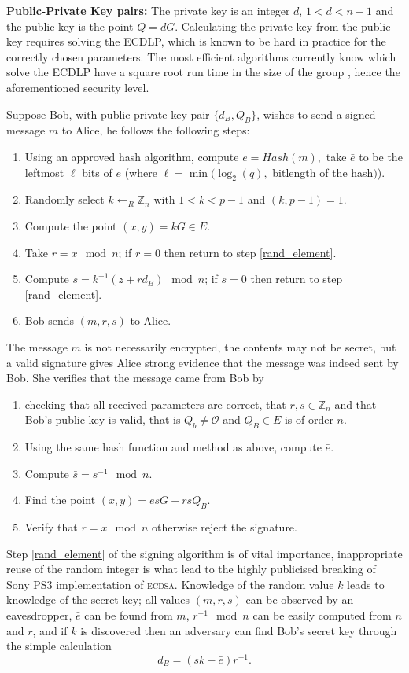 \documentclass[twocolumn]{svjour3}
\newcommand{\Z}{{\mathbb Z}}
\begin{document}
{\bf{Public-Private Key pairs:}} The private key is an integer $d$, $1<d<n-1$ and the public key is the point $Q=dG$. Calculating the private key from the public key requires solving the ECDLP, which is known to be hard in practice for the correctly chosen parameters. The most efficient algorithms currently know which solve the ECDLP have a square root run time in the size of the group \cite{WienerZ98,GallantLV00}, hence the aforementioned security level.
\vspace{0.5cm}

Suppose Bob, with public-private key pair $\{d_B,Q_B\}$, wishes to send a signed message $m$ to Alice, he follows the following steps:
\begin{enumerate}
\item Using an approved hash algorithm, compute $e=Hash(m),$ take $\bar{e}$ to be the leftmost $\ell$ bits of $e$ (where $\ell=\min(\log_2(q),$ bit\-length of the hash$)$). 
\item\label{rand_element} Randomly select $k\leftarrow_R\Z_n$ with $1<k<p-1$ and $(k,p-1)=1$.
\item\label{scalar_mult} Compute the point $(x,y)=kG\in E$. 
\item Take $r=x\mod n$; if $r=0$ then return to step \ref{rand_element}.
\item Compute $s=k^{-1}(z+rd_B)\mod n$; if $s=0$ then return to step \ref{rand_element}.
\item Bob sends $(m,r,s)$ to Alice.
\end{enumerate}
The message $m$ is not necessarily encrypted, the contents may not be secret, but a valid signature gives Alice strong evidence that the message was indeed sent by Bob. She verifies that the message came from Bob by 

\begin{enumerate}
\item checking that all received parameters are correct, that $r,s\in\Z_n$ and that Bob's public key is valid, that is $Q_b\neq \mathcal{O}$ and $Q_B\in E$ is of order $n$.
\item Using the same hash function and method as above, compute $\bar{e}$.
\item Compute $\bar{s}=s^{-1}\mod n$.
\item Find the point $(x,y)=\bar{es}G+r\bar{s}Q_B$.
\item Verify that $r=x\mod n$ otherwise reject the signature.
\end{enumerate}

Step \ref{rand_element} of the signing algorithm is of vital importance, inappropriate reuse of the random integer is what lead to the highly publicised breaking of Sony PS3 implementation of \textsc{ecdsa}. Knowledge of the random value $k$ leads to knowledge of the secret key; all values $(m,r,s)$ can be observed by an eavesdropper, $\bar{e}$ can be found from $m$, $r^{-1}\mod n$ can be easily computed from $n$ and $r$, and if $k$ is discovered then an adversary can find Bob's secret key through the simple calculation $$d_B=(sk-\bar{e})r^{-1}.$$
\end{document}
